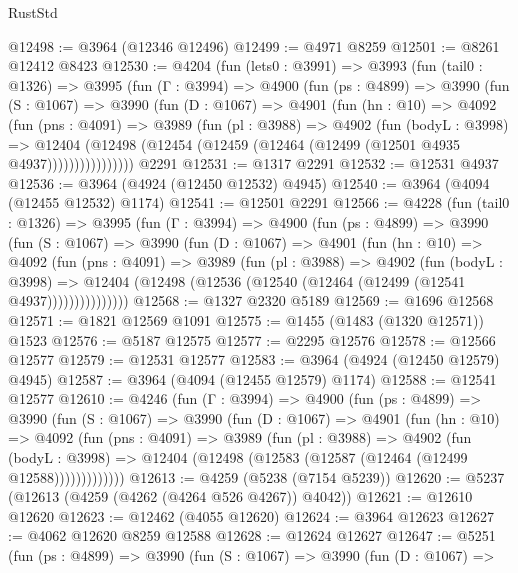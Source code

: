\begin{lexlean}{RustStd}
\begin{coremodule}
@12498 := @3964 (@12346 @12496)
@12499 := @4971 @8259
@12501 := @8261 @12412 @8423
@12530 := @4204
    (fun (lets0 : @3991) =>
    @3993
      (fun (tail0 : @1326) =>
      @3995
        (fun (Γ : @3994) =>
        @4900
          (fun (ps : @4899) =>
          @3990
            (fun (S : @1067) =>
            @3990
              (fun (D : @1067) =>
              @4901
                (fun (hn : @10) =>
                @4092
                  (fun (pns : @4091) =>
                  @3989
                    (fun (pl : @3988) =>
                    @4902
                      (fun (bodyL : @3998) =>
                      @12404
                        (@12498 (@12454 (@12459 (@12464 (@12499 (@12501 @4935 @4937))))))))))))))))
    @2291
@12531 := @1317 @2291
@12532 := @12531 @4937
@12536 := @3964 (@4924 (@12450 @12532) @4945)
@12540 := @3964 (@4094 (@12455 @12532) @1174)
@12541 := @12501 @2291
@12566 := @4228
    (fun (tail0 : @1326) =>
    @3995
      (fun (Γ : @3994) =>
      @4900
        (fun (ps : @4899) =>
        @3990
          (fun (S : @1067) =>
          @3990
            (fun (D : @1067) =>
            @4901
              (fun (hn : @10) =>
              @4092
                (fun (pns : @4091) =>
                @3989
                  (fun (pl : @3988) =>
                  @4902
                    (fun (bodyL : @3998) =>
                    @12404 (@12498 (@12536 (@12540 (@12464 (@12499 (@12541 @4937)))))))))))))))
@12568 := @1327 @2320 @5189
@12569 := @1696 @12568
@12571 := @1821 @12569 @1091
@12575 := @1455 (@1483 (@1320 @12571)) @1523
@12576 := @5187 @12575
@12577 := @2295 @12576
@12578 := @12566 @12577
@12579 := @12531 @12577
@12583 := @3964 (@4924 (@12450 @12579) @4945)
@12587 := @3964 (@4094 (@12455 @12579) @1174)
@12588 := @12541 @12577
@12610 := @4246
    (fun (Γ : @3994) =>
    @4900
      (fun (ps : @4899) =>
      @3990
        (fun (S : @1067) =>
        @3990
          (fun (D : @1067) =>
          @4901
            (fun (hn : @10) =>
            @4092
              (fun (pns : @4091) =>
              @3989
                (fun (pl : @3988) =>
                @4902
                  (fun (bodyL : @3998) =>
                  @12404 (@12498 (@12583 (@12587 (@12464 (@12499 @12588)))))))))))))
@12613 := @4259 (@5238 (@7154 @5239))
@12620 := @5237 (@12613 (@4259 (@4262 (@4264 @526 @4267)) @4042))
@12621 := @12610 @12620
@12623 := @12462 (@4055 @12620)
@12624 := @3964 @12623
@12627 := @4062 @12620 @8259 @12588
@12628 := @12624 @12627
@12647 := @5251
    (fun (ps : @4899) =>
    @3990
      (fun (S : @1067) =>
      @3990
        (fun (D : @1067) =>

\end{coremodule}
\end{lexlean}
